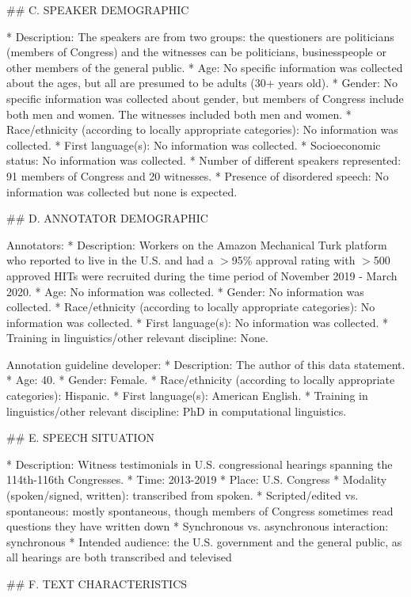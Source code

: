 \#\# C. SPEAKER DEMOGRAPHIC

* Description: The speakers are from two groups: the questioners are politicians (members of Congress) and the witnesses can be politicians, businesspeople or other members of the general public. 
* Age: No specific information was collected about the ages, but all are presumed to be adults (30+ years old).
* Gender: No specific information was collected about gender, but members of Congress include both men and women. The witnesses included both men and women.
* Race/ethnicity (according to locally appropriate categories): No information was collected.
* First language(s): No information was collected.
* Socioeconomic status: No information was collected.
* Number of different speakers represented: 91 members of Congress and 20 witnesses.
* Presence of disordered speech: No information was collected but none is expected.
 
\#\# D. ANNOTATOR DEMOGRAPHIC

Annotators:
* Description: Workers on the Amazon Mechanical Turk platform who reported to live in the U.S. and had a $>$95\% approval rating with $>$500 approved HITs were recruited during the time period of November 2019 - March 2020.
* Age: No information was collected.
* Gender: No information was collected.
* Race/ethnicity (according to locally appropriate categories): No information was collected.
* First language(s): No information was collected.
* Training in linguistics/other relevant discipline: None.

Annotation guideline developer:
* Description: The author of this data statement.
* Age: 40.
* Gender: Female.
* Race/ethnicity (according to locally appropriate categories): Hispanic.
* First language(s): American English.
* Training in linguistics/other relevant discipline: PhD in computational linguistics.


\#\# E. SPEECH SITUATION

* Description: Witness testimonials in U.S. congressional hearings spanning the 114th-116th Congresses.
* Time: 2013-2019
* Place: U.S. Congress
* Modality (spoken/signed, written): transcribed from spoken.
* Scripted/edited vs. spontaneous: mostly spontaneous, though members of Congress sometimes read questions they have written down
* Synchronous vs. asynchronous interaction: synchronous
* Intended audience:  the U.S. government and the general public, as all hearings are both transcribed and televised

\#\# F. TEXT CHARACTERISTICS

